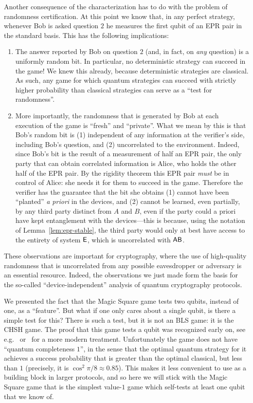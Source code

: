 Another consequence of the characterization has to do with the problem of randomness certification. At this point we know that, in any perfect strategy, whenever Bob is asked question $2$ he measures the first qubit of an EPR pair in the standard basis. This has the following implications:
\begin{enumerate}
\item The answer reported by Bob on question $2$ (and, in fact, on \emph{any} question) is a uniformly random bit. In particular, no deterministic strategy can succeed in the game! We knew this already, because deterministic strategies are classical. As such, any game for which quantum strategies can succeed with strictly higher probability than classical strategies can serve as a ``test for randomness''.
\item More importantly, the randomness that is generated by Bob at each execution of the game is ``fresh'' and ``private''. What we mean by this is that Bob's random bit is (1) independent of any information at the verifier's side, including Bob's question, and (2) uncorrelated to the environment. Indeed, since Bob's bit is the result of a measurement of half an EPR pair, the only party that can obtain correlated information is Alice, who holds the other half of the EPR pair. By the rigidity theorem this EPR pair \emph{must} be in control of Alice: she needs it for them to succeed in the game. Therefore the verifier has the guarantee that the bit she obtains (1) cannot have been ``planted'' \emph{a priori} in the devices, and (2) cannot be learned, even partially, by any third party distinct from $A$ and $B$, even if the party could a priori have kept entanglement with the devices---this is because, using the notation of Lemma~\ref{lem:epr-stable}, the third party would only at best have access to the entirety of system ${\textsf{E}}$, which is uncorrelated with ${\textsf{AB}}$. 
\end{enumerate}
These observations are important for cryptography, where the use of high-quality randomness that is uncorrelated from any possible eavesdropper or adversary is an essential resource. Indeed, the observations we just made form the basis for the so-called ``device-independent'' analysis of quantum cryptography protocols. 

\begin{remark}
We presented the fact that the Magic Square game tests two qubits, instead of one, as a ``feature''. But what if one only cares about a single qubit, is there a simple test for this? There is such a test, but it is not an BLS game: it is the CHSH game. The proof that this game tests a qubit was recognized early on, see e.g.~\cite{summers1987maximal} or~\cite{mckague2012robust} for a more modern treatment. Unfortunately the game does not have ``quantum completeness $1$'', in the sense that the optimal quantum strategy for it achieves a success probability that is greater than the optimal classical, but less than $1$ (precisely, it is $\cos^2 \pi/8 \approx 0.85$). This makes it less convenient to use as a building block in larger protocols, and so here we will stick with the Magic Square game that is the simplest value-$1$ game which self-tests at least one qubit that we know of. 
\end{remark}

